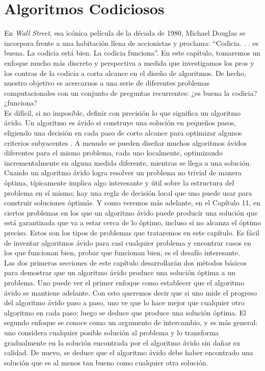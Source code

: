 \documentclass[a4paper, 12pt]{book}
\theoremstyle{dotless}
\begin{document}
\newpage

\chapter{Algoritmos Codiciosos}

En \textit{Wall Street}, esa icónica película de la década de 1980, Michael Douglas se incorpora frente a una habitación llena de accionistas y proclama: ``Codicia. . . es buena. La codicia está bien. La codicia funciona''. En este capítulo, tomaremos un enfoque mucho más discreto y perspectiva a medida que investigamos los pros y los contras de la codicia a corta alcance en el diseño de algoritmos. De hecho, nuestro objetivo es acercarnos a una serie de diferentes problemas computacionales con un conjunto de preguntas recurrentes: ¿es buena la codicia? ¿funciona?\\

Es difícil, si no imposible, definir con precisión lo que significa un algoritmo ávido. Un algoritmo es ávido si construye una solución en pequeños pasos, eligiendo una decisión en cada paso de corto alcance para optimizar algunos criterios subyacentes . A menudo se pueden diseñar muchos algoritmos ávidos diferentes para el mismo problema, cada uno localmente, optimizando incrementalmente en alguna medida diferente, mientras se llega a una solución.\\

Cuando un algoritmo ávido logra resolver un problema no trivial de manera óptima, típicamente implica algo interesante y útil sobre la estructura del problema en sí mismo; hay una regla de decisión local que uno puede usar para construir soluciones óptimás. Y como veremos más adelante, en el Capítulo 11, en ciertos problemas en los que un algoritmo ávido puede producir una solución que está garantizada que va a estar cerca de lo óptimo, incluso si no alcanza el óptimo preciso. Estos son los tipos de problemas que trataremos en este capítulo. Es fácil de inventar algoritmos ávido para casi cualquier problema y encontrar casos en los que funcionan bien, probar que funcionan bien, es el desafío interesante.\\

Las dos primeras secciones de este capítulo desarrollarán dos métodos básicos para demostrar que un algoritmo ávido produce una solución óptima a un problema. Uno puede ver el primer enfoque como establecer que el algoritmo ávido se mantiene adelante. Con esto queremos decir que si uno mide el progreso del algoritmo ávido paso a paso, uno ve que lo hace mejor que cualquier otro algoritmo en cada paso; luego se deduce que produce una solución óptima. El segundo enfoque se conoce como un argumento de intercambio, y es más general: uno considera cualquier posible solución al problema y lo transforma gradualmente en la solución encontrada por el algoritmo ávido sin dañar su calidad. De nuevo, se deduce que el algoritmo ávido debe haber encontrado una solución que es al menos tan bueno como cualquier otra solución.\\
\end{document}
